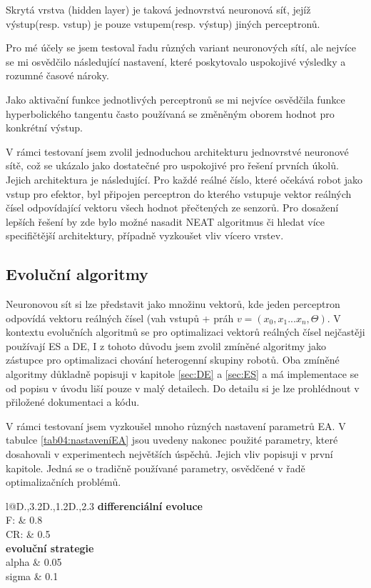 \par
Skrytá vrstva (hidden layer) je taková jednovrstvá neuronová síť, jejíž výstup(resp. vstup) je pouze vstupem(resp. výstup) jiných perceptronů.
\par
Pro mé účely se jsem testoval řadu různých variant neuronových sítí, ale nejvíce se mi osvědčilo následující nastavení, které poskytovalo uspokojivé výsledky a rozumné časové nároky. 
\par 
Jako aktivační funkce jednotlivých perceptronů se mi nejvíce osvědčila funkce hyperbolického tangentu často používaná se změněným oborem hodnot pro konkrétní výstup.
\par
V rámci testovaní jsem zvolil jednoduchou architekturu jednovrstvé neuronové sítě, což se ukázalo jako dostatečné pro uspokojivé pro řešení prvních úkolů. Jejich architektura je následující. Pro každé reálné číslo, které očekává robot jako vstup pro efektor, byl připojen perceptron do kterého vstupuje vektor reálných čísel odpovídající vektoru všech hodnot přečtených ze senzorů.  Pro dosažení lepších řešení by zde bylo možné nasadit NEAT algoritmus či hledat více specifičtější architektury, případně vyzkoušet vliv vícero vrstev. 
\subsection*{Evoluční algoritmy}
Neuronovou sít si lze představit jako množinu vektorů, kde jeden perceptron odpovídá vektoru reálných čísel (vah vstupů + práh $v =(x_0,x_1...x_n,\Theta)$. V kontextu evolučních algoritmů se pro optimalizaci vektorů reálných čísel nejčastěji používají ES a DE, I z tohoto důvodu jsem zvolil zmíněné algoritmy jako zástupce pro optimalizaci chování heterogenní skupiny robotů. Oba zmíněné algoritmy důkladně popisuji v kapitole \ref{sec:DE} a \ref{sec:ES} a má implementace se od popisu v úvodu liší pouze v malý detailech. Do detailu si je lze prohlédnout v přiložené dokumentaci a kódu. 
\par
V rámci testovaní jsem vyzkoušel mnoho různých nastavení parametrů EA. V tabulce \ref{tab04:nastaveníEA} jsou uvedeny nakonec použité parametry, které dosahovali v experimentech největších úspěchů. Jejich vliv popisuji v první kapitole. Jedná se o tradičně používané parametry, osvědčené v řadě optimalizačních problémů. 
\begin{table}[h]\centering
	\begin{tabular}{l@{\hspace{1.5cm}}D{.}{,}{3.2}D{.}{,}{1.2}D{.}{,}{2.3}}
		\toprule
		 \textbf{differenciální evoluce}\\
		\midrule
		F:     & 0.8 \\
		CR:  & 0.5 \\
		\toprule
		\textbf{evoluční strategie}\\
		\midrule
		alpha & 0.05 \\
		sigma & 0.1\\
		\bottomrule
	\end{tabular}
	\caption{Nastavení parametrů u EA}
	\label{tab04:nastaveníEA}
\end{table}
\newpage

